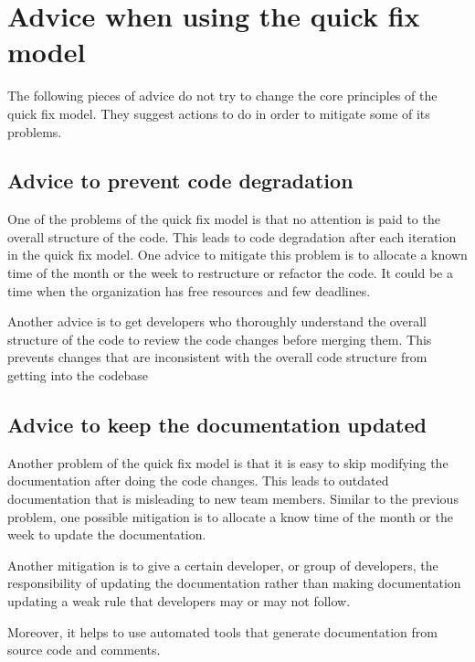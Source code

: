 \documentclass[11pt,a4paper]{article}
\begin{document}
\section{Advice when using the quick fix model}
The following pieces of advice do not try to change the core principles of the quick fix model.
They suggest actions to do in order to mitigate some of its problems.

\subsection{Advice to prevent code degradation}
One of the problems of the quick fix model is that no attention is paid to the overall structure of the code.
This leads to code degradation after each iteration in the quick fix model.
One advice to mitigate this problem is to
allocate a known time of the month or the week to restructure or refactor the code.
It could be a time when the organization has free resources and few deadlines.

Another advice is to get developers who thoroughly understand
the overall structure of the code to review the code changes before merging them.
This prevents changes that are inconsistent with the overall code structure from getting into the codebase

\subsection{Advice to keep the documentation updated}
Another problem of the quick fix model is that it is easy to skip modifying the documentation
after doing the code changes.
This leads to outdated documentation that is misleading to new team members.
Similar to the previous problem, one possible mitigation is to
allocate a know time of the month or the week to update the documentation.

Another mitigation is to give a certain developer, or group of developers, the responsibility of updating the
documentation rather than making documentation updating a weak rule that developers may or may not follow.

Moreover, it helps to use automated tools that generate documentation from source code and comments.
\end{document}
